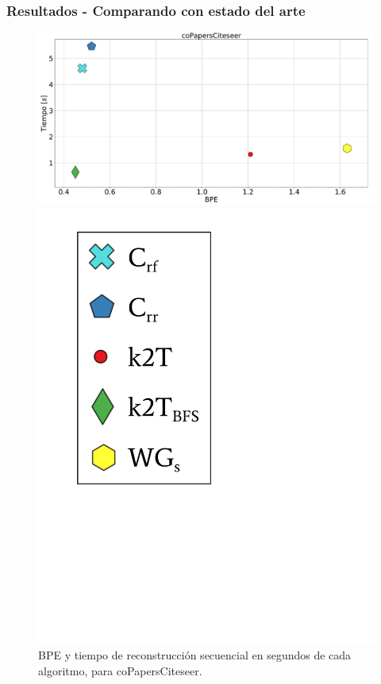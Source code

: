\begin{frame}
\frametitle{Resultados - Comparando con estado del arte}

\begin{figure}
	\centering
	
    	\begin{minipage}{1\textwidth}
    		\centering
    		\begin{minipage}{0.8\textwidth}
    			\centering
    			\includegraphics[width=1\linewidth]{../img/bpeTimes/secuencial/coPapersCiteseer.pdf}
    		\end{minipage}
    		\begin{minipage}{0.15\textwidth}
    			\centering
    			\includegraphics[scale=.16, clip, trim=70 200 280 40]{../img/bpeTimes/labelSec.pdf}
    		\end{minipage}	
    	\end{minipage}

	\caption{BPE y tiempo de reconstrucción secuencial en segundos de cada algoritmo, para coPapersCiteseer.}
\end{figure}

\end{frame}
